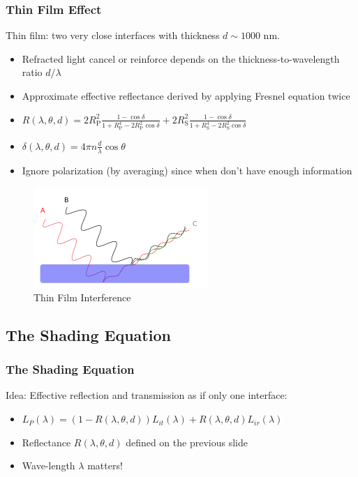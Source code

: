 \documentclass{beamer}
\begin{document}

\begin{frame}
	\frametitle{Thin Film Effect}
	Thin film: two very close interfaces with thickness $d \sim 1000$ nm.
	\begin{itemize}
		\item Refracted light cancel or reinforce depends on the thickness-to-wavelength ratio $d/\lambda$
		\item Approximate effective reflectance derived by applying Fresnel equation twice
		\item $	R(\lambda, \theta, d) = 2R_{\textrm{P}}^2\frac{1-\cos\delta}{1+R_{\textrm{P}}^4-2R_{\textrm{P}}^2\cos\delta}+2R_{\textrm{S}}^2\frac{1-\cos\delta}{1+R_{\textrm{S}}^4-2R_{\textrm{S}}^2\cos\delta}$
		\item $ \delta(\lambda, \theta, d) = 4\pi n\frac{d}{\lambda}\cos\theta $
		\item Ignore polarization (by averaging) since when don't have enough information
	\end{itemize}
	\begin{figure}
	\centering
	\includegraphics[width=0.3\linewidth]{thin_film_theory.png}
	\caption{Thin Film Interference}
	\end{figure}
\end{frame}


\subsection{The Shading Equation}

\begin{frame}
	\frametitle{The Shading Equation}
	Idea: Effective reflection and transmission as if only one interface:
	\begin{itemize}
		\item $	L_P(\lambda) = (1-R(\lambda, \theta, d))L_{it}(\lambda) + R(\lambda, \theta, d)L_{ir}(\lambda) $
		\item Reflectance $R(\lambda, \theta, d)$ defined on the previous slide
		\item Wave-length $\lambda$ matters!
	\end{itemize}
\end{frame}
\end{document}
